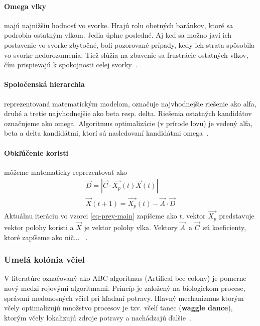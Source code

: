 \documentclass[a4paper,slovak,12pt,appendix]{article}
\begin{document}
\paragraph{Omega vlky} majú najnižšiu hodnosť vo svorke. Hrajú rolu obetných
baránkov, ktoré sa podrobia ostatným vlkom. Jedia úplne posledné. Aj keď sa
možno javí ich postavenie vo svorke zbytočné, boli pozorované prípady, kedy
ich strata spôsobila vo svorke nedorozumenia. Tiež slúžia na zbavenie sa
frustrácie ostatných vlkov, čím prispievajú k spokojnosti celej
svorky~\cite{Seeley1991}.

\paragraph{Spoločenská hierarchia} reprezentovaná matematickým modelom,
označuje najvhodnejšie riešenie ako alfa, druhé a tretie najvhodnejšie ako beta
resp. delta. Riešenia ostatných kandidátov označujeme ako omega. Algoritmus
optimalizácie (v prírode lovu) je vedený alfa, beta a delta kandidátmi, ktorí
sú nasledovaní kandidátmi omega~\cite{Seeley1991}.

\paragraph{Obkľúčenie koristi} môžeme matematicky reprezentovať ako
\begin{equation}
  \begin{split}
    \vec{D} = | \vec{C} \cdot \vec{X_p}(t) \vec{X}(t) |
    \\
    \vec{X}(t+1) = \vec{X_p}(t) - \vec{A} \cdot \vec{D}
  \end{split}
  \label{eq-prey-main}
\end{equation}
Aktuálnu iteráciu vo vzorci \ref{eq-prey-main} zapíšeme ako $t$, vektor
$\vec{X_p}$ predstavuje vektor polohy koristi a $\vec{X}$ je vektor polohy
vlka. Vektory $\vec{A}$ a $\vec{C}$ sú koeficienty, ktoré zapíšeme ako nič...
~\cite{Seeley1991}.


\subsubsection{Umelá kolónia včiel}
V literatúre označovaný ako ABC algoritmus (Artifical bee colony) je pomerne
nový medzi rojovými algoritmami. Princíp je založený na biologickom procese,
správaní medonosných včiel pri hľadaní potravy. Hlavný mechanizmus ktorým včely
optimalizujú množstvo procesov je tzv. včelí tanec (\textbf{waggle dance}),
ktorým včely lokalizujú zdroje potravy a nachádzajú ďalšie~\cite{Chavan2015}.
\end{document}
